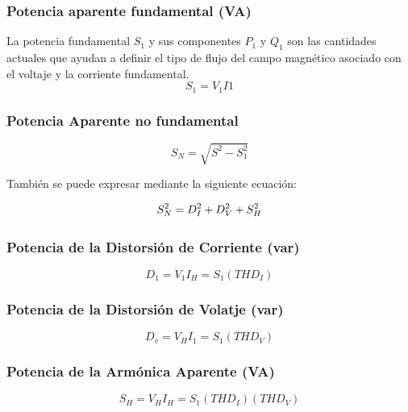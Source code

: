 \subsubsection{Potencia aparente fundamental (VA)}

La potencia fundamental $S_{1}$ y sus componentes $P_{1}$ y $Q_{1}$ son las cantidades actuales que ayudan a definir el tipo de flujo del campo magnético asociado con el voltaje y la corriente fundamental.\cite{A30}\\

\begin{equation}\label{EQ28}
S_{1}=V_{1}I{1}
\end{equation}

\subsubsection{Potencia Aparente no fundamental}

\begin{equation}\label{EQ29}
S_{N}=\sqrt{S^2-S^2_{1}}
\end{equation}

También se puede expresar mediante la siguiente ecuación:

\begin{equation}\label{EQ30}
S^2_{N}=D^2_{I}+D^2_{V}+S^2_{H}\\
\end{equation}

\subsubsection{Potencia de la Distorsión de Corriente (var)}
\begin{equation} \label{EQ60}
D_{1}=V_{1}I_{H}=S_{1}(THD_{I})
\end{equation}

\subsubsection{Potencia de la Distorsión de Volatje (var)}
\begin{equation} \label{EQ61}
D_{v}=V_{H}I_{1}=S_{1}(THD_{V})
\end{equation}

\subsubsection{Potencia de la Armónica Aparente (VA)}
\begin{equation} \label{EQ62}
S_{H}=V_{H}I_{H}=S_{1}(THD_{I})(THD_{V})
\end{equation}


